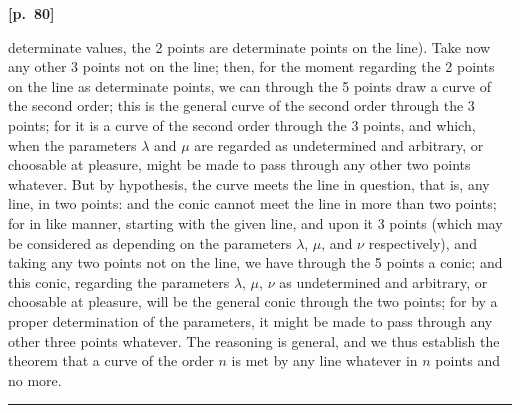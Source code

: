 \documentclass[11pt,a4paper]{article}
\theoremstyle{plain}
\begin{document}
\vspace{0.5em}
\noindent\textbf{[p.\ 80]}

determinate values, the 2 points are determinate points on the line). Take now any other 3 points not on the line; then, for the moment regarding the 2 points on the line as determinate points, we can through the 5 points draw a curve of the second order; this is the general curve of the second order through the 3 points; for it is a curve of the second order through the 3 points, and which, when the parameters $\lambda$ and $\mu$ are regarded as undetermined and arbitrary, or choosable at pleasure, might be made to pass through any other two points whatever. But by hypothesis, the curve meets the line in question, that is, any line, in two points: and the conic cannot meet the line in more than two points; for in like manner, starting with the given line, and upon it 3 points (which may be considered as depending on the parameters $\lambda$, $\mu$, and $\nu$ respectively), and taking any two points not on the line, we have through the 5 points a conic; and this conic, regarding the parameters $\lambda$, $\mu$, $\nu$ as undetermined and arbitrary, or choosable at pleasure, will be the general conic through the two points; for by a proper determination of the parameters, it might be made to pass through any other three points whatever. The reasoning is general, and we thus establish the theorem that a curve of the order $n$ is met by any line whatever in $n$ points and no more.

\vspace{1em}
\begin{center}
\rule{0.5\textwidth}{0.4pt}
\end{center}
\end{document}
